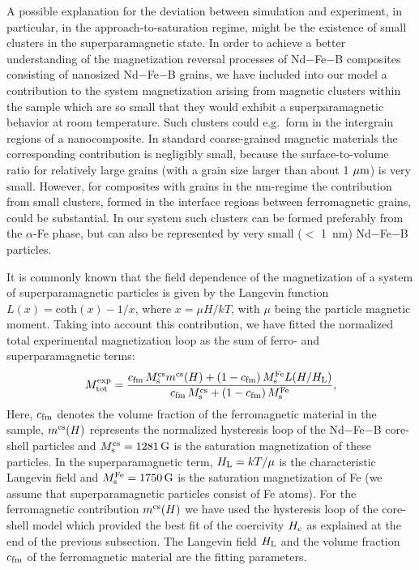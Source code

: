 \documentclass[prm,twocolumn,showkeys,preprintnumbers,amsmath,amssymb,superscriptaddress,aps,10pt]{revtex4-1}
\begin{document}
A possible explanation for the deviation between simulation and experiment, in particular, in the approach-to-saturation regime, might be the existence of small clusters in the superparamagnetic state. In order to achieve a better understanding of the magnetization reversal processes of Nd$-$Fe$-$B composites consisting of nanosized Nd$-$Fe$-$B grains, we have included into our model a contribution to the system magnetization arising from magnetic clusters within the sample which are so small that they would exhibit a superparamagnetic behavior at room temperature. Such clusters could e.g.\ form in the intergrain regions of a nanocomposite. In standard coarse-grained magnetic materials the corresponding contribution is negligibly small, because the surface-to-volume ratio for relatively large grains (with a grain size larger than about 1 $\mu {\rm m}$) is very small. However, for composites with grains in the nm-regime the contribution from small clusters, formed in the interface regions between ferromagnetic grains, could be substantial. In our system such clusters can be formed preferably from the $\alpha$-Fe phase, but can also be represented by very small ($<$ 1~nm) Nd$-$Fe$-$B particles.

It is commonly known that the field dependence of the magnetization of a system of superparamagnetic particles is given by the Langevin function $L(x) = {\mathrm{coth}}(x) - 1/x$, where $x = \mu H/kT$, with $\mu$ being the particle magnetic moment. Taking into account this contribution, we have fitted the normalized total experimental magnetization loop as the sum of ferro- and superparamagnetic terms: 
\begin{equation}
\label{langevinfitnew}
M_{\rm tot}^{\rm exp} = 
\frac{c_{\mathrm{fm}} \, M^{\mathrm{cs}}_{\mathrm{s}} m^{\mathrm{cs}}(H) + 
(1 - c_{\mathrm{fm}}) \, M^{\mathrm{Fe}}_{\mathrm{s}} L(H/H_{\mathrm{L}})}
{c_{\mathrm{fm}} \, M^{\mathrm{cs}}_{\mathrm{s}} + (1 - c_{\mathrm{fm}}) \, M^{\mathrm{Fe}}_{\mathrm{s}}}, 
\end{equation}
Here, $c_{\rm fm}$ denotes the volume fraction of the ferromagnetic material in the sample, $m^{\rm cs}(H)$ represents the normalized hysteresis loop of the Nd$-$Fe$-$B core-shell particles and $M^{\rm cs}_{\rm s} = 1281 \, \rm{G}$ is the saturation magnetization of these particles. In the superparamagnetic term, $H_{\rm L} = kT/\mu$ is the characteristic Langevin field and $M^{\rm Fe}_{\rm s} = 1750 \, \rm{G}$ is  the saturation magnetization of Fe (we assume that superparamagnetic particles consist of Fe atoms). For the ferromagnetic contribution $m^{\rm cs}(H)$ we have used the hysteresis loop of the core-shell model which provided the best fit of the coercivity $H_{\rm c}$ as explained at the end of the previous subsection. The Langevin field $H_{\rm L}$ and the volume fraction $c_{\rm fm}$ of the ferromagnetic material are the fitting parameters. 
\end{document}
